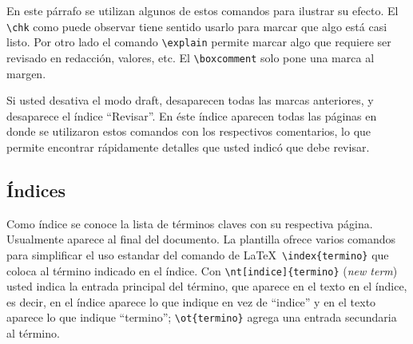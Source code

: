 En este párrafo se utilizan algunos de estos comandos
para ilustrar su efecto.  El \verb+\chk+ como puede observar tiene sentido
usarlo para marcar que algo está casi listo.  Por otro lado 
el comando \verb+\explain+ permite marcar algo que requiere ser revisado en
redacción, valores, etc.  El \verb+\boxcomment+
solo pone una marca al margen.


Si usted desativa el modo draft, desaparecen todas las marcas
anteriores, y desaparece el índice ``Revisar''.  En éste índice
aparecen todas las páginas en donde se utilizaron estos comandos con
los respectivos comentarios, lo que permite encontrar rápidamente
detalles que usted indicó que debe revisar.

\subsection{Índices}

Como índice se conoce la lista de términos claves con su respectiva
página.  Usualmente aparece al final del documento.  La plantilla
ofrece varios comandos para simplificar el uso estandar del comando de
\LaTeX\ \verb+\index{termino}+ que coloca al término indicado en el
índice.  Con \verb+\nt[indice]{termino}+ (\emph{new term}) usted
indica la entrada principal del término, que aparece en el texto en el
índice, es decir, en el índice aparece lo que indique en vez de
``indice'' y en el texto aparece lo que indique ``termino'';
\verb+\ot{termino}+ agrega una entrada secundaria al término.
